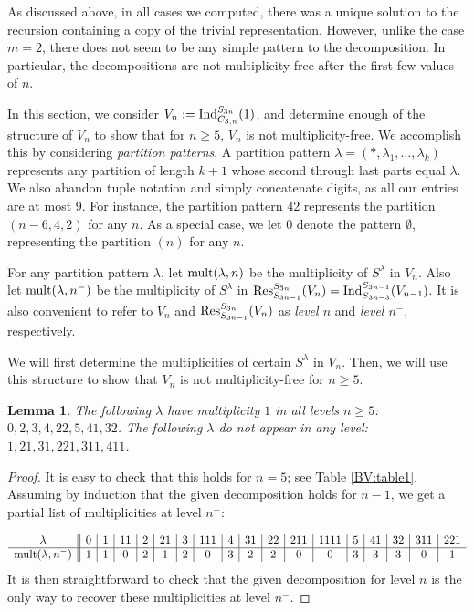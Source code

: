 \documentclass[12pt]{amsart}
\newtheorem{lemma}[theorem]{Lemma}
\numberwithin{theorem}{section}
\newcommand{\Ind}{\textup{Ind}}
\newcommand{\Res}{\textup{Res}}
\newcommand{\mult}{\textup{mult}}
\begin{document}
As discussed above, in all cases we computed, there was a unique
solution to the recursion containing a copy of the trivial representation.
However, unlike the case $m=2$, there does not seem to be any simple pattern to the decomposition.
In particular, the decompositions are not multiplicity-free after the first few values of $n$.

In this section, we consider $V_n := \Ind_{C_{3,n}}^{S_{3n}}(1)$, and determine enough of the structure of $V_n$ to show that
for $n \ge 5$, $V_n$ is not multiplicity-free. We accomplish this by considering {\em partition patterns}. A partition pattern $\lambda = (*,\lambda_1,\ldots,\lambda_k)$ represents any partition of length $k+1$ whose second through last parts equal $\lambda$. We also abandon tuple notation and simply concatenate digits, as all our entries are at most 9. For instance, the partition pattern $42$ represents the partition $(n-6,4,2)$ for any $n$. As a special case, we let $0$ denote the pattern $\emptyset$, representing the partition $(n)$ for any $n$.

For any partition pattern $\lambda$, let $\mult(\lambda,n)$ be the multiplicity of $S^\lambda$ in $V_n$. Also let $\mult(\lambda,n^-)$ be the multiplicity of $S^\lambda$ in $\Res^{S_{3n}}_{S_{3n-1}}(V_n) = \Ind_{S_{3n-3}}^{S_{3n-1}}(V_{n-1})$. It is also convenient to refer to $V_n$ and $\Res^{S_{3n}}_{S_{3n-1}}(V_n)$ as {\em level $n$} and {\em level $n^-$}, respectively. 

We will first determine the multiplicities of certain $S^\lambda$ in $V_n$. Then, we will use this structure to show that $V_n$ is not multiplicity-free for
$n \ge 5$.


\begin{lemma}\label{BV:inductivelemma}
The following $\lambda$ have multiplicity $1$ in all levels $n \ge 5$: 
$0,2,3,4,22,5,41,32$. The following $\lambda$ do not appear in any level: $1,21,31,221,311,411$.
\end{lemma}
\begin{proof}
It is easy to check that this holds for $n=5$; see Table \ref{BV:table1}. Assuming by induction that the
given decomposition holds for $n-1$, we get a partial list of multiplicities
at level $n^-$:


$$
\begin{array}{c||c|c|c|c|c|c|c|c|c|c|c|c|c|c|c|c|c}
\lambda &0&1&11&2&21&3&111&4&31&22&211&1111&5&41&32&311&221 \\ \hline
\mult(\lambda,n^-)&1&1&0&2&1&2&0&3&2&2&0&0&3&3&3&0&1
\end{array}
$$
It is then straightforward to check that
the given decomposition for level $n$ is the only way to recover these multiplicities at level $n^-$.
\end{proof}
\end{document}

